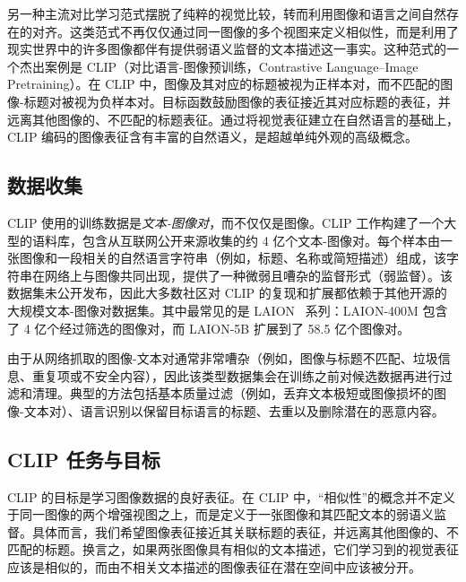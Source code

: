 \documentclass[../../book-main_zh.tex]{subfiles}
\begin{document}
另一种主流对比学习范式摆脱了纯粹的视觉比较，转而利用图像和语言之间自然存在的对齐。这类范式不再仅仅通过同一图像的多个视图来定义相似性，而是利用了现实世界中的许多图像都伴有提供弱语义监督的文本描述这一事实。这种范式的一个杰出案例是 CLIP（对比语言-图像预训练，Contrastive Language–Image Pretraining）\citep{Radford2021-ir}。在 CLIP 中，图像及其对应的标题被视为正样本对，而不匹配的图像-标题对被视为负样本对。目标函数鼓励图像的表征接近其对应标题的表征，并远离其他图像的、不匹配的标题表征。通过将视觉表征建立在自然语言的基础上，CLIP 编码的图像表征含有丰富的自然语义，是超越单纯外观的高级概念。

\subsection{数据收集}

CLIP 使用的训练数据是{\em 文本-图像对}，而不仅仅是图像。CLIP 工作构建了一个大型的语料库，包含从互联网公开来源收集的约 4 亿个文本-图像对。每个样本由一张图像和一段相关的自然语言字符串（例如，标题、名称或简短描述）组成，该字符串在网络上与图像共同出现，提供了一种微弱且嘈杂的监督形式（弱监督）。该数据集未公开发布，因此大多数社区对 CLIP 的复现和扩展都依赖于其他开源的大规模文本-图像对数据集。其中最常见的是 LAION~\citep{schuhmann2022laion5bopenlargescaledataset} 系列：LAION-400M 包含了 4 亿个经过筛选的图像对，而 LAION-5B 扩展到了 58.5 亿个图像对。

由于从网络抓取的图像-文本对通常非常嘈杂（例如，图像与标题不匹配、垃圾信息、重复项或不安全内容），因此该类型数据集会在训练之前对候选数据再进行过滤和清理。典型的方法包括基本质量过滤（例如，丢弃文本极短或图像损坏的图像-文本对）、语言识别以保留目标语言的标题、去重以及删除潜在的恶意内容。

\subsection{CLIP 任务与目标}
CLIP 的目标是学习图像数据的良好表征。在 CLIP 中，“相似性”的概念并不定义于同一图像的两个增强视图之上，而是定义于一张图像和其匹配文本的弱语义监督。具体而言，我们希望图像表征接近其关联标题的表征，并远离其他图像的、不匹配的标题。换言之，如果两张图像具有相似的文本描述，它们学习到的视觉表征应该是相似的，而由不相关文本描述的图像表征在潜在空间中应该被分开。
\end{document}
